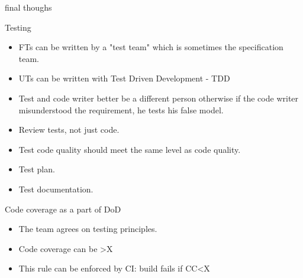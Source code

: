 \documentclass{beamer}
\begin{document}

\begin{frame}{final thoughs}

\begin{block}{Testing}
\small

\begin{itemize}
  \item FTs can be written by a "test team" which is sometimes the specification team.
  \item UTs can be written with Test Driven Development - TDD \cite{tdd}
  \item Test and code writer better be a different person otherwise if the code writer misunderstood the requirement, he tests his false model.
  \item Review tests, not just code.
  \item Test code quality should meet the same level as code quality.
  \item Test plan.
  \item Test documentation.
\end{itemize}
\end{block}

\begin{block}{Code coverage as a part of DoD}
\small

\begin{itemize}
  \item The team agrees on testing principles.
  \item Code coverage can be >X%
  \item This rule can be enforced by CI: build fails if CC<X%
\end{itemize}
\end{block}

\end{frame}

\end{document}
